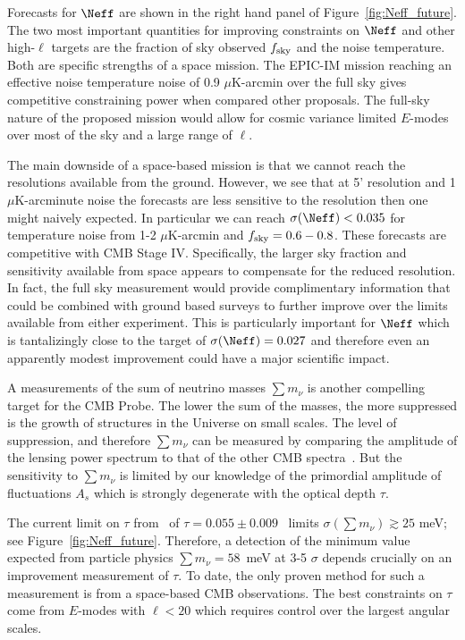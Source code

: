Forecasts for $\Neff$ are shown in the right hand panel of Figure~\ref{fig:Neff_future}.  The two most important quantities for improving 
constraints on $\Neff$ and other high-$\ell$ targets are the fraction of sky observed $f_{\rm sky}$ and the noise temperature. Both are 
specific strengths of a space mission. The EPIC-IM mission reaching 
an effective noise temperature noise of 0.9 $\mu$K-arcmin over the full sky gives competitive constraining power when compared other proposals.  
The full-sky nature of the proposed mission would allow for cosmic variance limited $E$-modes over most of the sky and a large range of $\ell$.

The main downside of a space-based mission is that we cannot reach the resolutions available from the ground.  However, 
we see that at 5' resolution and 1 $\mu$K-arcminute noise the forecasts are less sensitive to the resolution then one might naively 
expected.  In particular we can reach $\sigma(\Neff) < 0.035$ for temperature noise from 1-2 $\mu$K-arcmin and $f_{\rm sky} =0.6-0.8$.  
These forecasts are competitive with CMB Stage IV.  Specifically, the larger sky fraction and sensitivity available from space appears 
to compensate for the reduced resolution.  In fact, the full sky measurement would provide complimentary information that could be 
combined with ground based surveys to further improve over the limits available from either experiment.  This is particularly important for 
$\Neff$ which is tantalizingly close to the target of $\sigma(\Neff) =0.027$ and therefore even an apparently modest improvement 
could have a major scientific impact.  

A measurements of the sum of neutrino masses $\sum m_\nu$ is another compelling target for the \ac{CMB} Probe. 
The lower the sum of the masses, the more suppressed is the growth of structures in the Universe on small scales. 
The level of suppression, and therefore $\sum m_\nu$ can be measured by comparing the amplitude of the lensing power 
spectrum to that of the other CMB spectra~\cite{Kaplinghat:2003bh}. But the sensitivity to $\sum m_\nu$ is limited by our knowledge of 
the primordial amplitude of fluctuations $A_s$ which is strongly degenerate with the optical depth $\tau$. 

The current limit on $\tau$ from \planck\ of 
$\tau = 0.055 \pm 0.009$~\cite{} limits 
$\sigma(\sum m_\nu) \gtrsim 25$ meV; see Figure~\ref{fig:Neff_future}.  
Therefore, a detection of the minimum value expected from particle physics  
$\sum m_\nu = 58$~meV at 3-5 $\sigma$ depends crucially on an improvement measurement of $\tau$.  
To date, the only proven method for such a measurement is from a space-based CMB observations.  The best 
constraints on $\tau$ come from $E$-modes with $\ell < 20$ which requires control over the largest angular scales.  

